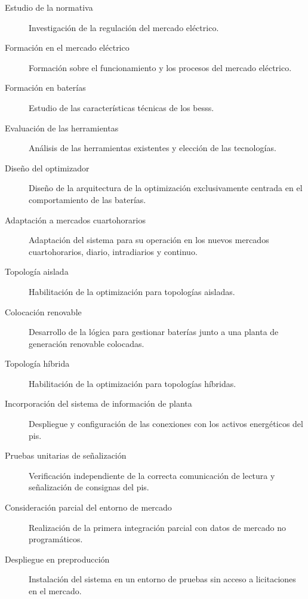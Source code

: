 \begin{description}

  \item[Estudio de la normativa] Investigación de la regulación del mercado eléctrico.

  \item[Formación en el mercado eléctrico] Formación sobre el funcionamiento y los procesos del mercado eléctrico.

  \item[Formación en baterías] Estudio de las características técnicas de los \glspl{bess}.

  \item[Evaluación de las herramientas] Análisis de las herramientas existentes y elección de las tecnologías.

  \item[Diseño del optimizador] Diseño de la arquitectura de la optimización exclusivamente centrada en el comportamiento de las baterías.

  \item[Adaptación a mercados cuartohorarios] Adaptación del sistema para su operación en los nuevos mercados cuartohorarios, diario, intradiarios y continuo.

  \item[Topología aislada] Habilitación de la optimización para topologías aisladas.

  \item[Colocación renovable] Desarrollo de la lógica para gestionar baterías junto a una planta de generación renovable colocadas.

  \item[Topología híbrida] Habilitación de la optimización para topologías híbridas.

  \item[Incorporación del sistema de información de planta] Despliegue y configuración de las conexiones con los activos energéticos del \gls{pis}.

  \item[Pruebas unitarias de señalización] Verificación independiente de la correcta comunicación de lectura y señalización de consignas del \gls{pis}.

  \item[Consideración parcial del entorno de mercado] Realización de la primera integración parcial con datos de mercado no programáticos.

  \item[Despliegue en preproducción] Instalación del sistema en un entorno de pruebas sin acceso a licitaciones en el mercado.


\end{description}
